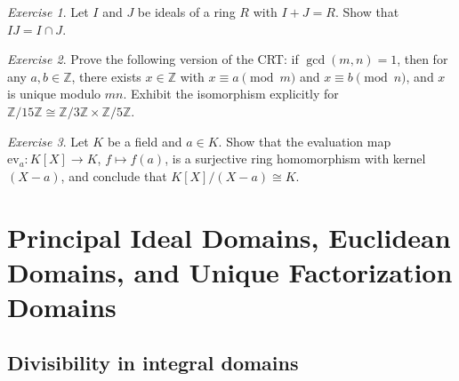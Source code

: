 \documentclass[12pt,a4paper,openany]{book}
\theoremstyle{definition}
\theoremstyle{remark}
\newtheorem{exercise}{Exercise}[chapter]
\renewcommand{\gcd}{\operatorname{gcd}}
\begin{document}
\begin{exercise}\label{exo:quot-10}
Let $I$ and $J$ be ideals of a ring $R$ with $I+J=R$. Show that $IJ=I\cap J$.
\end{exercise}

\begin{exercise}\label{exo:quot-11}
Prove the following version of the CRT: if $\gcd(m,n)=1$, then for any $a,b\in\mathbb{Z}$, there exists $x\in\mathbb{Z}$ with $x\equiv a\pmod{m}$ and $x\equiv b\pmod{n}$, and $x$ is unique modulo $mn$. Exhibit the isomorphism explicitly for $\mathbb{Z}/15\mathbb{Z}\cong\mathbb{Z}/3\mathbb{Z}\times\mathbb{Z}/5\mathbb{Z}$.
\end{exercise}

\begin{exercise}\label{exo:quot-12}
Let $K$ be a field and $a\in K$. Show that the evaluation map $\mathrm{ev}_a\colon K[X]\to K$, $f\mapsto f(a)$, is a surjective ring homomorphism with kernel $(X-a)$, and conclude that $K[X]/(X-a)\cong K$.
\end{exercise}

\medskip
\begin{center}
\end{center}


\chapter{Principal Ideal Domains, Euclidean Domains, and Unique Factorization Domains}\label{ch:pid-ed-ufd}

\section{Divisibility in integral domains}\label{sec:divisibility}
\end{document}
